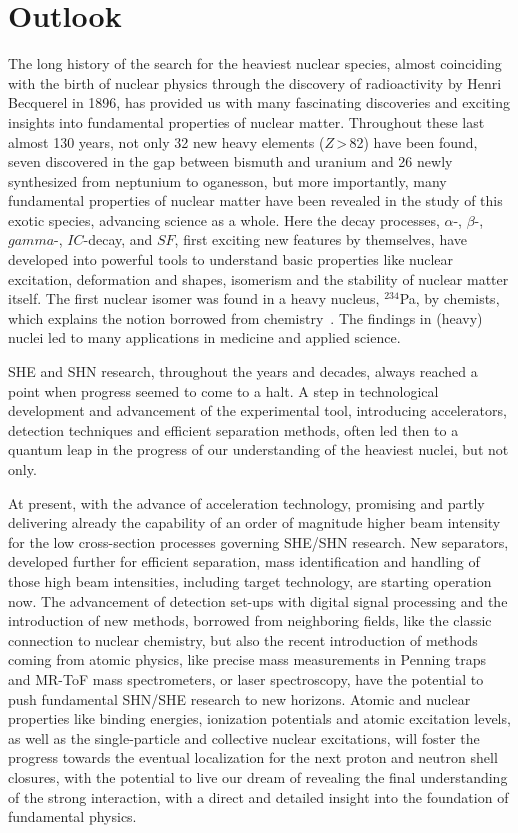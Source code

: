 \newpage
\section{Outlook}\label{outlook}

The long history of the search for the heaviest nuclear species, almost coinciding with the birth of nuclear physics through the discovery of radioactivity by Henri Becquerel in 1896, has provided us with many fascinating discoveries and exciting insights into fundamental properties of nuclear matter. 
Throughout these last almost 130 years, not only 32 new heavy elements ($Z$\,>\,82) have been found, seven discovered in the gap between bismuth and uranium and 26 newly synthesized from neptunium to oganesson, but more importantly, many fundamental properties of nuclear matter have been revealed in the study of this  exotic species, advancing science as a whole. 
Here the decay processes, $\alpha$-, $\beta$-, $gamma$-, $IC$-decay, and $SF$, first exciting new features by themselves, have developed into powerful tools to understand basic properties like nuclear excitation, deformation and shapes, isomerism and the stability of nuclear matter itself. 
The first nuclear isomer was found in a heavy nucleus, $^{234}$Pa, by chemists, which explains the notion borrowed from chemistry~\cite{Ackermann2017}. 
The findings in (heavy) nuclei led to many applications in medicine and applied science.

SHE and SHN research, throughout the years and decades, always reached a point when progress seemed to come to a halt. 
A step in technological development and advancement of the experimental tool, introducing accelerators, detection techniques and efficient separation methods, often led then to a quantum leap in the progress of our understanding of the heaviest nuclei, but not only.

At present, with the advance of acceleration technology, promising and partly delivering already the capability of an order of magnitude higher beam intensity for the low cross-section processes governing SHE/SHN research. 
New separators, developed further for efficient separation, mass identification and handling of those high beam intensities, including target technology, are starting operation now. 
The advancement of detection set-ups with digital signal processing and the introduction of new methods, borrowed from neighboring fields, like the classic connection to nuclear chemistry, but also the recent introduction of methods coming from atomic physics, like precise mass measurements in Penning traps and MR-ToF mass spectrometers, or laser spectroscopy, have the potential to push fundamental SHN/SHE research to new horizons. 
Atomic and nuclear properties like binding energies, ionization potentials and atomic excitation levels, as well as the single-particle and collective nuclear excitations, will foster the progress towards the eventual localization for the next proton and neutron shell closures, with the potential to live our dream of revealing the final understanding of the strong interaction, with a direct and detailed insight into the foundation of fundamental physics.

